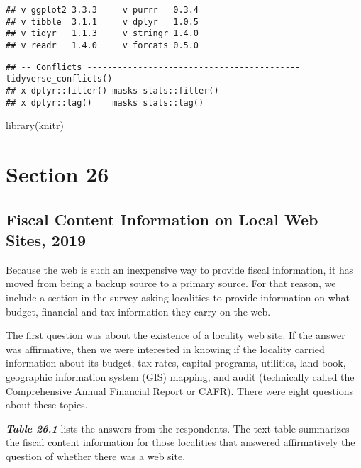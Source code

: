 \documentclass[
]{book}
\newenvironment{Shaded}{\begin{snugshade}}{\end{snugshade}}
\newcommand{\FunctionTok}[1]{\textcolor[rgb]{0.00,0.00,0.00}{#1}}
\newcommand{\NormalTok}[1]{#1}
\begin{document}
\begin{verbatim}
## v ggplot2 3.3.3     v purrr   0.3.4
## v tibble  3.1.1     v dplyr   1.0.5
## v tidyr   1.1.3     v stringr 1.4.0
## v readr   1.4.0     v forcats 0.5.0
\end{verbatim}

\begin{verbatim}
## -- Conflicts ------------------------------------------ tidyverse_conflicts() --
## x dplyr::filter() masks stats::filter()
## x dplyr::lag()    masks stats::lag()
\end{verbatim}

\begin{Shaded}
\begin{Highlighting}[]
\FunctionTok{library}\NormalTok{(knitr)}
\end{Highlighting}
\end{Shaded}

\hypertarget{section-26}{%
\chapter{Section 26}\label{section-26}}

\hypertarget{fiscal-content-information-on-local-web-sites-2019}{%
\section{Fiscal Content Information on Local Web Sites, 2019}\label{fiscal-content-information-on-local-web-sites-2019}}

Because the web is such an inexpensive way to provide fiscal information, it has moved from being a backup source to a primary source. For that reason, we include a section in the survey asking localities to provide information on what budget, financial and tax information they carry on the web.

The first question was about the existence of a locality web site. If the answer was affirmative, then we were interested in knowing if the locality carried information about its budget, tax rates, capital programs, utilities, land book, geographic information system (GIS) mapping, and audit (technically called the Comprehensive Annual Financial Report or CAFR). There were eight questions about these topics.

\textbf{\emph{Table 26.1}} lists the answers from the respondents. The text table summarizes the fiscal content information for those localities that answered affirmatively the question of whether there was a web site.
\end{document}
